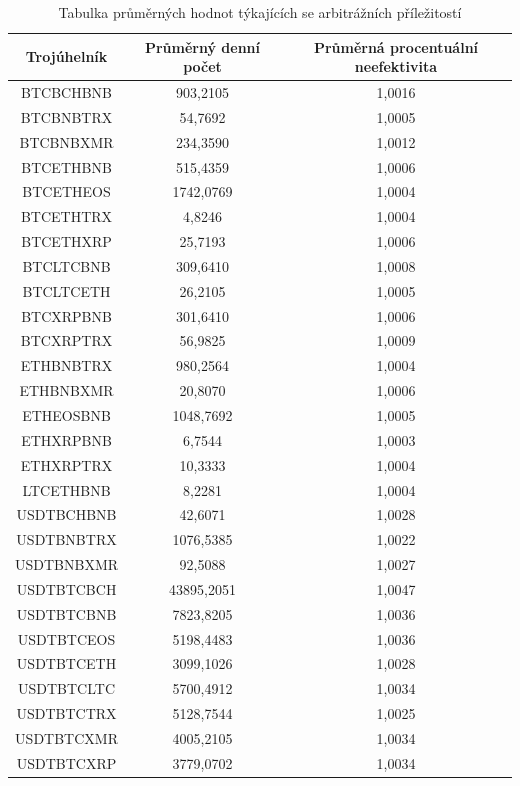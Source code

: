 \documentclass[thesis=B,czech]{FITthesis}[2019/03/21]
\begin{document}
\begin{table}\centering
\caption{Tabulka průměrných hodnot týkajících se arbitrážních příležitostí}
\label{table_averages}
\begin{tabular}{|| c | c | c ||}\hline Trojúhelník & Průměrný denní počet & Průměrná procentuální neefektivita\\ [0.5ex]
 \hline\hline BTCBCHBNB & 903,2105 & 1,0016\\ 
 \hline BTCBNBTRX & 54,7692 & 1,0005\\ 
 \hline BTCBNBXMR & 234,3590 & 1,0012\\ 
 \hline BTCETHBNB & 515,4359 & 1,0006\\ 
 \hline BTCETHEOS & 1742,0769 & 1,0004\\ 
 \hline BTCETHTRX & 4,8246 & 1,0004\\ 
 \hline BTCETHXRP & 25,7193 & 1,0006\\ 
 \hline BTCLTCBNB & 309,6410 & 1,0008\\ 
 \hline BTCLTCETH & 26,2105 & 1,0005\\ 
 \hline BTCXRPBNB & 301,6410 & 1,0006\\ 
 \hline BTCXRPTRX & 56,9825 & 1,0009\\ 
 \hline ETHBNBTRX & 980,2564 & 1,0004\\ 
 \hline ETHBNBXMR & 20,8070 & 1,0006\\ 
 \hline ETHEOSBNB & 1048,7692 & 1,0005\\ 
 \hline ETHXRPBNB & 6,7544 & 1,0003\\ 
 \hline ETHXRPTRX & 10,3333 & 1,0004\\ 
 \hline LTCETHBNB & 8,2281 & 1,0004\\ 
 \hline USDTBCHBNB & 42,6071 & 1,0028\\ 
 \hline USDTBNBTRX & 1076,5385 & 1,0022\\ 
 \hline USDTBNBXMR & 92,5088 & 1,0027\\ 
 \hline USDTBTCBCH & 43895,2051 & 1,0047\\ 
 \hline USDTBTCBNB & 7823,8205 & 1,0036\\ 
 \hline USDTBTCEOS & 5198,4483 & 1,0036\\ 
 \hline USDTBTCETH & 3099,1026 & 1,0028\\ 
 \hline USDTBTCLTC & 5700,4912 & 1,0034\\ 
 \hline USDTBTCTRX & 5128,7544 & 1,0025\\ 
 \hline USDTBTCXMR & 4005,2105 & 1,0034\\ 
 \hline USDTBTCXRP & 3779,0702 & 1,0034\\ 

\end{tabular}
\end{table}
\end{document}

